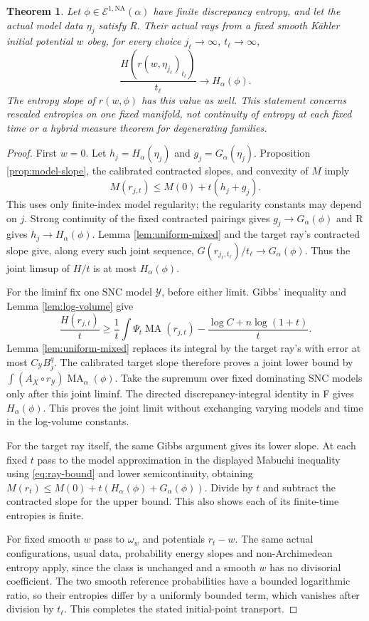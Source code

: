 \documentclass[11pt]{article}
\newcommand{\MA}{\operatorname{MA}}
\newcommand{\NA}{\mathrm{NA}}
\newcommand{\cE}{\mathcal E}
\newtheorem{theorem}{Theorem}
\theoremstyle{remark}\newtheorem{remark}[theorem]{Remark}
\begin{document}
\begin{theorem}\label{thm:joint-entropy}
Let $\phi\in\cE^{1,\NA}(\alpha)$ have finite discrepancy entropy,
and let the actual model data $\eta_j$ satisfy R. Their actual rays
from a fixed smooth K\"ahler initial potential $w$ obey, for every
choice $j_\ell\to\infty$, $t_\ell\to\infty$,
\[
 \frac{H(r(w,\eta_{j_\ell})_{t_\ell})}{t_\ell}
          \longrightarrow H_\alpha(\phi).
\]
The entropy slope of $r(w,\phi)$ has this value as well.
This statement concerns rescaled entropies on one fixed manifold,
not continuity of entropy at each fixed time or a hybrid measure
theorem for degenerating families.
\end{theorem}
\begin{proof}
First $w=0$. Let $h_j=H_\alpha(\eta_j)$ and
$g_j=G_\alpha(\eta_j)$. Proposition \ref{prop:model-slope}, the
calibrated contracted slopes, and convexity of $M$ imply
\[
 M(r_{j,t})\leq M(0)+t(h_j+g_j).
\]
This uses only finite-index model regularity; the regularity constants
may depend on $j$. Strong continuity of the fixed contracted pairings
gives $g_j\to G_\alpha(\phi)$ and R gives $h_j\to H_\alpha(\phi)$.
Lemma \ref{lem:uniform-mixed} and the target ray's contracted slope
give, along every such joint sequence,
$G(r_{j_\ell,t_\ell})/t_\ell\to G_\alpha(\phi)$. Thus the joint
limsup of $H/t$ is at most $H_\alpha(\phi)$.

For the liminf fix one SNC model $\mathcal Y$, before either limit.
Gibbs' inequality and Lemma \ref{lem:log-volume} give
\[
 \frac{H(r_{j,t})}{t}\geq\frac1t\int\Psi_t\MA(r_{j,t})
     -\frac{\log C+n\log(1+t)}t.
\]
Lemma \ref{lem:uniform-mixed} replaces its integral by the target
ray's with error at most $C_{\mathcal Y}B_j^q$. The calibrated target
slope therefore proves a joint lower bound by
$\int(A_X\circ r_{\mathcal Y})\MA_\alpha(\phi)$.
Take the supremum over fixed dominating SNC models only after this
joint liminf. The directed discrepancy-integral identity in F gives
$H_\alpha(\phi)$. This proves the joint limit without exchanging
varying models and time in the log-volume constants.

For the target ray itself, the same Gibbs argument gives its lower
slope. At each fixed $t$ pass to the model approximation in the
displayed Mabuchi inequality using \eqref{eq:ray-bound} and lower
semicontinuity, obtaining
$M(r_t)\leq M(0)+t(H_\alpha(\phi)+G_\alpha(\phi))$.
Divide by $t$ and subtract the contracted slope for the upper bound.
This also shows each of its finite-time entropies is finite.

For fixed smooth $w$ pass to $\omega_w$ and potentials $r_t-w$.
The same actual configurations, usual data, probability energy slopes
and non-Archimedean entropy apply, since the class is unchanged and a
smooth $w$ has no divisorial coefficient. The two smooth reference
probabilities have a bounded logarithmic ratio, so their entropies
differ by a uniformly bounded term, which vanishes after division
by $t_\ell$. This completes the stated initial-point transport.
\end{proof}
\end{document}
